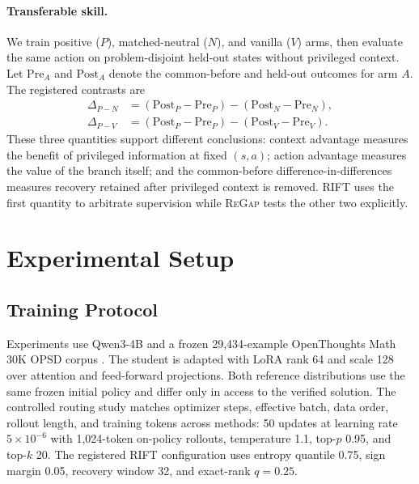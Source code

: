 \documentclass[letterpaper]{article}
\newcommand{\RIFT}{\textsc{RIFT}}
\newcommand{\ReGap}{\textsc{ReGap}}
\begin{document}
\paragraph{Transferable skill.}
We train positive ($P$), matched-neutral ($N$), and vanilla ($V$) arms, then
evaluate the same action on problem-disjoint held-out states without privileged
context. Let $\mathrm{Pre}_A$ and $\mathrm{Post}_A$ denote the common-before and
held-out outcomes for arm $A$. The registered contrasts are
\begin{equation}
\begin{aligned}
\Delta_{P-N}&=(\mathrm{Post}_P-\mathrm{Pre}_P)
 -(\mathrm{Post}_N-\mathrm{Pre}_N),\\
\Delta_{P-V}&=(\mathrm{Post}_P-\mathrm{Pre}_P)
 -(\mathrm{Post}_V-\mathrm{Pre}_V).
\end{aligned}
\label{eq:regap_did}
\end{equation}
These three quantities support different conclusions: context advantage
measures the benefit of privileged information at fixed $(s,a)$; action
advantage measures the value of the branch itself; and the common-before
difference-in-differences measures recovery retained after privileged context
is removed. \RIFT{} uses the first quantity to arbitrate supervision while
\ReGap{} tests the other two explicitly.

\section{Experimental Setup}

\subsection{Training Protocol}

Experiments use Qwen3-4B \citep{yang2025qwen3} and a frozen 29,434-example
OpenThoughts Math 30K OPSD corpus
\citep{zhao2026opsd,guha2025openthoughts}. The student is adapted with LoRA
rank 64 and scale 128 over attention and feed-forward projections. Both
reference distributions use the same frozen initial policy and differ only in
access to the verified solution. The controlled routing study matches
optimizer steps, effective batch, data order, rollout length, and training
tokens across methods: 50 updates at learning rate $5\times10^{-6}$ with
1,024-token on-policy rollouts, temperature 1.1, top-$p$ 0.95, and top-$k$ 20.
The registered \RIFT{} configuration uses entropy quantile 0.75, sign margin
0.05, recovery window 32, and exact-rank $q=0.25$.
\end{document}
